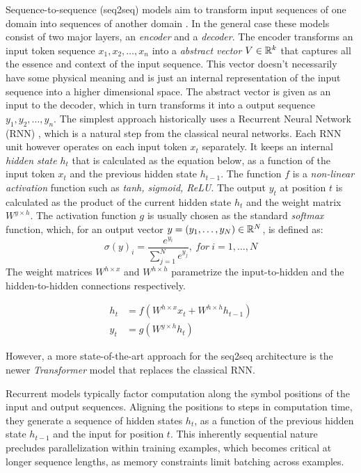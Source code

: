 Sequence-to-sequence (seq2seq) models aim to transform input sequences of one
domain into sequences of another domain \citep{Sutskever_2014}. In the general
case these models consist of two major layers, an \emph{encoder} and a
\emph{decoder}. The encoder transforms an input token sequence $x_1, x_2, \dots,
x_n$ into a \emph{abstract vector} $V \in \mathbb{R}^k$ that captures all the essence
and context of the input sequence. This vector doesn't necessarily have some
physical meaning and is just an internal representation of the input sequence
into a higher dimensional space. The abstract vector is given as an input to the
decoder, which in turn transforms it into a output sequence $y_1, y_2, \dots,
y_n$. The simplest approach historically uses a Recurrent Neural Network (RNN)
\citep{Rumelhart1986, Werbos1990, Hochreiter_1997}, which is a natural step from
the classical neural networks. Each RNN unit however operates on each input
token $x_t$ separately. It keeps an internal \emph{hidden state} $h_t$ that is
calculated as the equation below, as a function of the input token $x_t$ and the
previous hidden state $h_{t-1}$. The function $f$ is a \emph{non-linear
activation} function such as \emph{tanh, sigmoid, ReLU}. The output $y_t$ at
position $t$ is calculated as the product of the current hidden state $h_t$ and
the weight matrix $W^{y\times h}$. The activation function $g$ is usually chosen
as the standard \emph{softmax} function, which, for an output vector $y = (y_1,
\dots, y_N) \in \mathbb{R}^{N}$, is defined as:
\[ \sigma(y)_i = \frac{e^{y_i}}{\sum_{j=1}^{N} e^{y_j}},\ for\ i = 1, \dots, N
\] The weight matrices $W^{h\times x}$ and $W^{h\times h}$ parametrize the
input-to-hidden and the hidden-to-hidden connections respectively.

\begin{align*}
    h_t &= f(W^{h\times x} x_t + W^{h\times h} h_{t-1}) \\
    y_t &= g(W^{y\times h} h_t)
\end{align*}

However, a more state-of-the-art approach for the seq2seq architecture is the
newer \emph{Transformer} model \citep{Vaswani_2017} that replaces the classical
RNN.

Recurrent models typically factor computation along the symbol positions of the
input and output sequences. Aligning the positions to steps in computation time,
they generate a sequence of hidden states $h_t$, as a function of the previous
hidden state $h_{t-1}$ and the input for position $t$. This inherently
sequential nature precludes parallelization within training examples, which
becomes critical at longer sequence lengths, as memory constraints limit
batching across examples.

